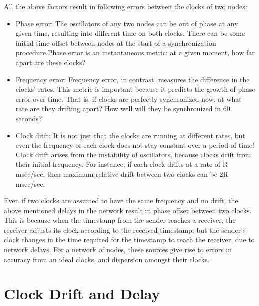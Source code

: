 \documentclass[a4paper,8pt]{report}
\begin{document}
      All the above factors result in following errors between the clocks of two nodes:
\begin{itemize}
\item Phase error: The oscillators of any two nodes can be out of phase at
any given time, resulting into different time on both clocks. There
can be some initial time-offset between nodes at the start of a
synchronization procedure.Phase error is an instantaneous metric: at a given moment, how far apart are
these clocks?
\item Frequency error: Frequency error, in contrast, measures the difference in the clocks’
rates. This metric is important because it predicts the growth of phase error over
time. That is, if clocks are perfectly synchronized now, at what rate are they
drifting apart? How well will they be synchronized in 60 seconds?
\item Clock drift: It is not just that the clocks are running at different rates, but even
the frequency of each clock does not stay constant over a period of
time! Clock drift arises from the instability of oscillators,
because clocks drift from their initial frequency. For instance, if each clock
drifts at a rate of R msec/sec, then maximum relative drift between
two clocks can be 2R msec/sec.
\end{itemize}
      Even if two clocks are assumed to have the same frequency and no drift, the above
mentioned delays in the network result in phase offset between two
clocks. This is because when the timestamp from the sender reaches a
receiver, the receiver adjusts its clock according to the received
timestamp; but the sender's clock changes in the time required for
the timestamp to reach the receiver, due to network delays.
      For a network of nodes, these sources give rise to errors in accuracy from an ideal
clocks, and dispersion amongst their clocks.
\section{Clock Drift and Delay}
\end{document}
